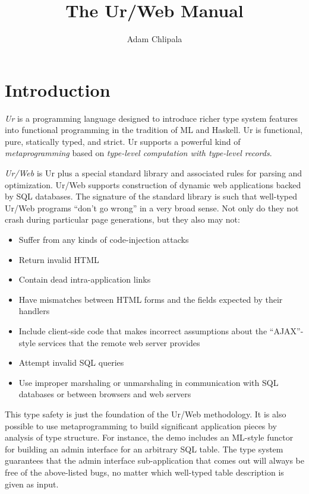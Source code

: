 \documentclass{article}
\begin{document}
\title{The Ur/Web Manual}
\author{Adam Chlipala}

\maketitle

\tableofcontents


\section{Introduction}

\emph{Ur} is a programming language designed to introduce richer type system features into functional programming in the tradition of ML and Haskell.  Ur is functional, pure, statically typed, and strict.  Ur supports a powerful kind of \emph{metaprogramming} based on \emph{type-level computation with type-level records}.

\emph{Ur/Web} is Ur plus a special standard library and associated rules for parsing and optimization.  Ur/Web supports construction of dynamic web applications backed by SQL databases.  The signature of the standard library is such that well-typed Ur/Web programs ``don't go wrong'' in a very broad sense.  Not only do they not crash during particular page generations, but they also may not:

\begin{itemize}
\item Suffer from any kinds of code-injection attacks
\item Return invalid HTML
\item Contain dead intra-application links
\item Have mismatches between HTML forms and the fields expected by their handlers
\item Include client-side code that makes incorrect assumptions about the ``AJAX''-style services that the remote web server provides
\item Attempt invalid SQL queries
\item Use improper marshaling or unmarshaling in communication with SQL databases or between browsers and web servers
\end{itemize}

This type safety is just the foundation of the Ur/Web methodology.  It is also possible to use metaprogramming to build significant application pieces by analysis of type structure.  For instance, the demo includes an ML-style functor for building an admin interface for an arbitrary SQL table.  The type system guarantees that the admin interface sub-application that comes out will always be free of the above-listed bugs, no matter which well-typed table description is given as input.
\end{document}
